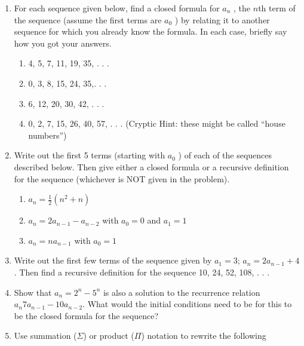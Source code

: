 \documentclass[11pt]{article} %
\newcommand\setItemNumber[1]{\setcounter{enumi}{\numexpr#1-1\relax}}
\begin{document}
        \begin{enumerate}

            \setItemNumber{2}
            \item For each sequence given below, find a closed formula for $a_n$ , the $n$th term of the sequence (assume the first terms are $a_0$ ) by relating it to another sequence for which you already know the formula. In each case, briefly say how you got your answers.
                \begin{enumerate}
                    \item 4, 5, 7, 11, 19, 35, . . .
                    \item 0, 3, 8, 15, 24, 35,. . .
                    \item 6, 12, 20, 30, 42, . . .
                    \item 0, 2, 7, 15, 26, 40, 57, . . . (Cryptic Hint: these might be called “house numbers”)
                \end{enumerate}

            \item Write out the first 5 terms (starting with $a_0$ ) of each of the sequences described below. Then give either a closed formula or a recursive definition for the sequence (whichever is NOT given in the problem).
                \begin{enumerate}
                    \item $a_n = \frac{1}{2}(n^2 + n)$  
                    \item $a_n = 2a_{n - 1} - a_{n - 2}$ with $a_0 = 0$ and $a_1 = 1$
                    \item $a_n = na_{n - 1}$ with $a_0 = 1$
                \end{enumerate}

            \setItemNumber{7}
        \item Write out the first few terms of the sequence given by $a_1 = 3$; $a_n = 2a_{n - 1} + 4$. Then find a recursive definition for the sequence 10, 24, 52, 108, . . .


            \setItemNumber{10}
        \item Show that $a_n = 2^n - 5^n$ is also a solution to the recurrence relation $a_n  7a_{n − 1} − 10a_{n − 2}$. What would the initial conditions need to be for this to be the closed formula for the sequence?


            \setItemNumber{13}
        \item Use summation ($\Sigma$) or product ($\Pi$) notation to rewrite the following
            \begin{enumerate}


\end{enumerate}
\end{enumerate}
\end{document}
